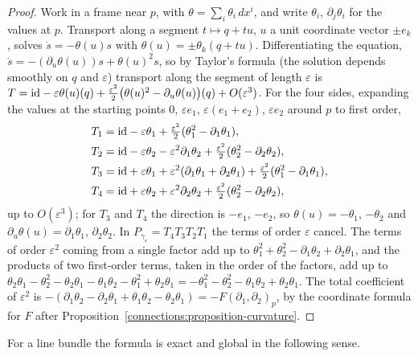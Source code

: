 \begin{proof}
Work in a frame near $p$, with $\theta = \sum_i\theta_i\,dx^i$, and write $\theta_i$, $\partial_j\theta_i$ for the values at $p$. Transport along a segment $t \mapsto q + tu$, $u$ a unit
coordinate vector $\pm e_k$, solves $\dot s = -\theta(u)s$ with $\theta(u) = \pm\theta_k(q + tu)$. Differentiating the equation, $\ddot s = -(\partial_u\theta(u))s + \theta(u)^2s$, so by
Taylor's formula (the solution depends smoothly on $q$ and $\varepsilon$) transport along the segment of length $\varepsilon$ is
$T = \mathrm{id} - \varepsilon\theta(u)(q) + \frac{\varepsilon^2}2\bigl(\theta(u)^2 - \partial_u\theta(u)\bigr)(q) + O(\varepsilon^3)$. For the four sides, expanding the values at the starting
points $0$, $\varepsilon e_1$, $\varepsilon(e_1 + e_2)$, $\varepsilon e_2$ around $p$ to first order,
\[
\begin{aligned}
T_1 &= \mathrm{id} - \varepsilon\theta_1 + \tfrac{\varepsilon^2}2(\theta_1^2 - \partial_1\theta_1),\\
T_2 &= \mathrm{id} - \varepsilon\theta_2 - \varepsilon^2\partial_1\theta_2 + \tfrac{\varepsilon^2}2(\theta_2^2 - \partial_2\theta_2),\\
T_3 &= \mathrm{id} + \varepsilon\theta_1 + \varepsilon^2(\partial_1\theta_1 + \partial_2\theta_1) + \tfrac{\varepsilon^2}2(\theta_1^2 - \partial_1\theta_1),\\
T_4 &= \mathrm{id} + \varepsilon\theta_2 + \varepsilon^2\partial_2\theta_2 + \tfrac{\varepsilon^2}2(\theta_2^2 - \partial_2\theta_2),
\end{aligned}
\]
up to $O(\varepsilon^3)$; for $T_3$ and $T_4$ the direction is $-e_1$, $-e_2$, so $\theta(u) = -\theta_1$, $-\theta_2$ and $\partial_u\theta(u) = \partial_1\theta_1$, $\partial_2\theta_2$. In
$P_{\gamma_\varepsilon} = T_4T_3T_2T_1$ the terms of order $\varepsilon$ cancel. The terms of order $\varepsilon^2$ coming from a single factor add up to
$\theta_1^2 + \theta_2^2 - \partial_1\theta_2 + \partial_2\theta_1$, and the products of two first-order terms, taken in the order of the factors, add up to
$\theta_2\theta_1 - \theta_2^2 - \theta_2\theta_1 - \theta_1\theta_2 - \theta_1^2 + \theta_2\theta_1 = -\theta_1^2 - \theta_2^2 - \theta_1\theta_2 + \theta_2\theta_1$. The total coefficient
of $\varepsilon^2$ is $-(\partial_1\theta_2 - \partial_2\theta_1 + \theta_1\theta_2 - \theta_2\theta_1) = -F(\partial_1, \partial_2)_p$, by the coordinate formula for $F$ after
Proposition~\ref{connections:proposition-curvature}.
\end{proof}

For a line bundle the formula is exact and global in the following sense.

